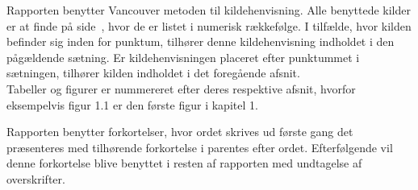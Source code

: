Rapporten benytter Vancouver metoden til kildehenvisning. Alle benyttede kilder er at finde på side~\pageref{litteraturliste}, hvor de er listet i numerisk rækkefølge. I tilfælde, hvor kilden befinder sig inden for punktum, tilhører denne kildehenvisning indholdet i den pågældende sætning. Er kildehenvisningen placeret efter punktummet i sætningen, tilhører kilden indholdet i det foregående afsnit. \\
Tabeller og figurer er nummereret efter deres respektive afsnit, hvorfor eksempelvis figur 1.1 er den første figur i kapitel 1.

Rapporten benytter forkortelser, hvor ordet skrives ud første gang det præsenteres med tilhørende forkortelse i parentes efter ordet. Efterfølgende vil denne forkortelse blive benyttet i resten af rapporten med undtagelse af overskrifter. 
